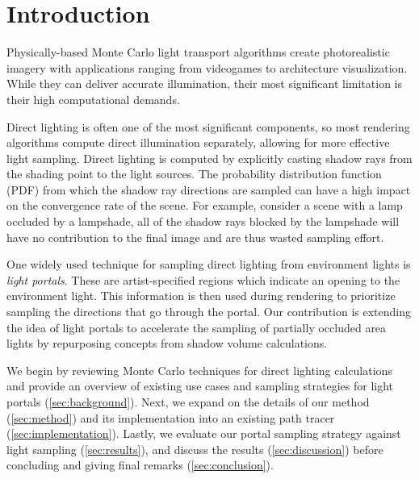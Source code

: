 \section{Introduction}
\label{sec:intro}

Physically-based Monte Carlo light transport algorithms create photorealistic imagery with applications ranging from videogames to architecture visualization. While they can deliver accurate illumination, their most significant limitation is their high computational demands. 

Direct lighting is often one of the most significant components, so most rendering algorithms compute direct illumination separately, allowing for more effective light sampling. Direct lighting is computed by explicitly casting shadow rays from the shading point to the light sources. The probability distribution function (PDF) from which the shadow ray directions are sampled can have a high impact on the convergence rate of the scene. For example, consider a scene with a lamp occluded by a lampshade, all of the shadow rays blocked by the lampshade will have no contribution to the final image and are thus wasted sampling effort.

One widely used technique for sampling direct lighting from environment lights is \emph{light portals}. These are artist-specified regions which indicate an opening to the environment light. This information is then used during rendering to prioritize sampling the directions that go through the portal. Our contribution is extending the idea of light portals to accelerate the sampling of partially occluded area lights by repurposing concepts from shadow volume calculations.

We begin by reviewing Monte Carlo techniques for direct lighting calculations and provide an overview of existing use cases and sampling strategies for light portals (\autoref{sec:background}). Next, we expand on the details of our method (\autoref{sec:method}) and its implementation into an existing path tracer (\autoref{sec:implementation}). Lastly, we evaluate our portal sampling strategy against light sampling (\autoref{sec:results}), and discuss the results (\autoref{sec:discussion}) before concluding and giving final remarks (\autoref{sec:conclusion}).
